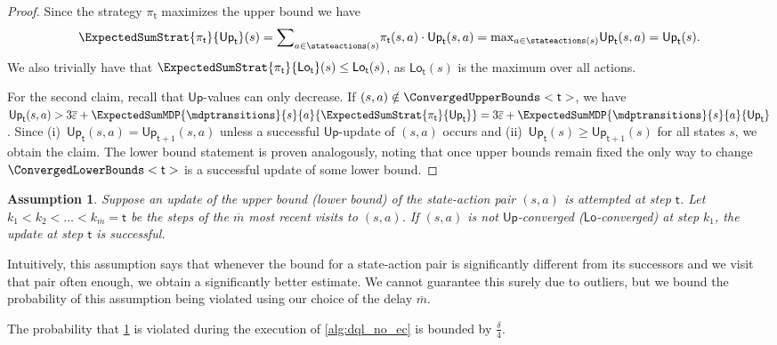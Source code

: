 \documentclass{theoretics}
\newcommand{\strategy}{\pi}
\newcommand{\upperbound}{\mathsf{Up}}
\newcommand{\lowerbound}{\mathsf{Lo}}
\newcommand{\updatestep}{{\overline{\varepsilon}}}
\newcommand{\delay}{{\overline{m}}}
\newcommand{\algostep}{\mathsf{t}}
\newtheorem{assumption}{Assumption}
\begin{document}
\begin{proof}
	Since the strategy $\strategy_\algostep$ maximizes the upper bound we have
	\begin{equation*}
		\ExpectedSumStrat{\strategy_\algostep}{\upperbound_\algostep}(s) = {\sum}_{a \in \stateactions(s)} \strategy_\algostep(s, a) \cdot \upperbound_\algostep(s, a) = {\max}_{a \in \stateactions(s)} \upperbound_\algostep(s, a) = \upperbound_\algostep(s).
	\end{equation*}
	We also trivially have that $\ExpectedSumStrat{\strategy_\algostep}{\lowerbound_\algostep}(s) \leq \lowerbound_\algostep(s)$, as $\lowerbound_\algostep(s)$ is the maximum over all actions.

	For the second claim, recall that $\upperbound$-values can only decrease.
	If $(s, a) \notin \ConvergedUpperBounds<\algostep>$, we have $\upperbound_\algostep(s, a) > 3 \updatestep + \ExpectedSumMDP{\mdptransitions}{s}{a}{\ExpectedSumStrat{\strategy_\algostep}{\upperbound_\algostep}} = 3 \updatestep + \ExpectedSumMDP{\mdptransitions}{s}{a}{\upperbound_\algostep}$.
	Since (i)~$\upperbound_\algostep(s, a) = \upperbound_{\algostep + 1}(s, a)$ unless a successful $\upperbound$-update of $(s, a)$ occurs and (ii)~$\upperbound_\algostep(s) \geq \upperbound_{\algostep + 1}(s)$ for all states $s$, we obtain the claim.
	The lower bound statement is proven analogously, noting that once upper bounds remain fixed the only way to change $\ConvergedLowerBounds<\algostep>$ is a successful update of some lower bound. 
\end{proof}
\begin{assumption} \label{asm:dql_no_ec:converged_successful_update}
	Suppose an update of the upper bound (lower bound) of the state-action pair $(s, a)$ is attempted at step $\algostep$.
	Let $k_1 < k_2 < \ldots < k_\delay = \algostep$ be the steps of the $\delay$ most recent visits to $(s, a)$.
	If $(s, a)$ is not $\upperbound$-converged ($\lowerbound$-converged) at step $k_1$, the update at step $\algostep$ is successful.
\end{assumption}
Intuitively, this assumption says that whenever the bound for a state-action pair is significantly different from its successors and we visit that pair often enough, we obtain a significantly better estimate.
We cannot guarantee this surely due to outliers, but we bound the probability of this assumption being violated using our choice of the delay $\delay$.
\begin{lemma} \label{stm:dql_no_ec:converged_successful_update_probability}
	The probability that \cref{asm:dql_no_ec:converged_successful_update} is violated during the execution of \cref{alg:dql_no_ec} is bounded by $\frac{\delta}{4}$.
\end{lemma}
\end{document}
